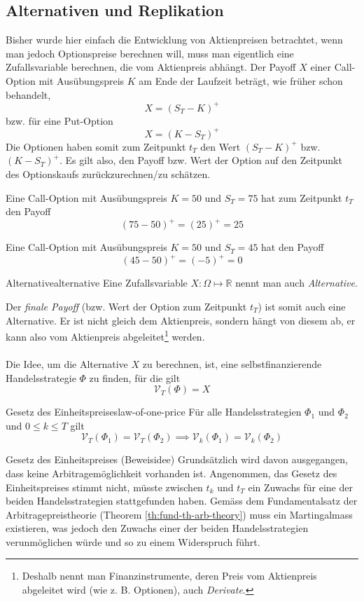 \documentclass[11pt]{report} %
\begin{document}
\subsection{Alternativen und Replikation}
Bisher wurde hier einfach die Entwicklung von Aktienpreisen betrachtet, wenn man jedoch Optionspreise berechnen will, muss man eigentlich eine Zufallsvariable berechnen, die vom Aktienpreis abhängt. Der Payoff $X$ einer Call-Option mit Ausübungspreis $K$ am Ende der Laufzeit beträgt, wie früher schon behandelt, $$X=(S_T-K)^+$$ bzw. für eine Put-Option $$X=(K-S_T)^+$$Die Optionen haben somit zum Zeitpunkt $t_T$ den Wert $(S_T-K)^+$ bzw. $(K-S_T)^+$. Es gilt also, den Payoff bzw. Wert der Option auf den Zeitpunkt des Optionskaufs zurückzurechnen/zu schätzen.
\begin{Beispiel}{}{}
    Eine Call-Option mit Ausübungspreis $K=50$ und $S_T=75$ hat zum Zeitpunkt $t_T$ den Payoff $$(75-50)^+=(25)^+=25$$
\end{Beispiel}
\begin{Beispiel}{}{}
     Eine Call-Option mit Ausübungspreis $K=50$ und $S_T=45$ hat den Payoff $$(45-50)^+=(-5)^+=0$$
\end{Beispiel}
\begin{Definition}{Alternative}{alternative}
    Eine Zufallsvariable $X:\Omega \mapsto \mathbb{R}$ nennt man auch \textit{Alternative}.
\end{Definition}
Der \textit{finale Payoff} (bzw. Wert der Option zum Zeitpunkt $t_T$) ist somit auch eine Alternative. Er ist nicht gleich dem Aktienpreis, sondern hängt von diesem ab, er kann also vom Aktienpreis abgeleitet\footnote{Deshalb nennt man Finanzinstrumente, deren Preis vom Aktienpreis abgeleitet wird (wie z. B. Optionen), auch \textit{Derivate}.} werden.
\\\\Die Idee, um die Alternative $X$ zu berechnen, ist, eine selbstfinanzierende Handelsstrategie $\Phi$ zu finden, für die gilt $$\mathcal{V}_T(\Phi)=X$$
\begin{Theorem}{Gesetz des Einheitspreises}{law-of-one-price}
    Für alle Handelsstrategien $\Phi_1$ und $\Phi_2$ und $0\leq k \leq T$ gilt $$\mathcal{V}_T(\Phi_1)=\mathcal{V}_T(\Phi_2) \implies \mathcal{V}_k(\Phi_1)=\mathcal{V}_k(\Phi_2)$$
\end{Theorem}
\begin{Beweis}{Gesetz des Einheitspreises (Beweisidee)}{}
    Grundsätzlich wird davon ausgegangen, dass keine Arbitragemöglichkeit vorhanden ist. Angenommen, das Gesetz des Einheitspreises stimmt nicht, müsste zwischen $t_k$ und $t_T$ ein Zuwachs für eine der beiden Handelsstrategien stattgefunden haben. Gemäss dem Fundamentalsatz der Arbitragepreistheorie (Theorem \ref{th:fund-th-arb-theory}) muss ein Martingalmass existieren, was jedoch den Zuwachs einer der beiden Handelsstrategien verunmöglichen würde und so zu einem Widerspruch führt.
\end{Beweis}
\end{document}
